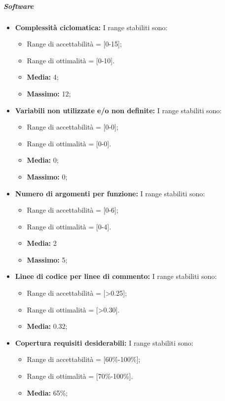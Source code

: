 \subparagraph{Software}
\begin{itemize}
\item \textbf{Complessità ciclomatica: }I range stabiliti sono:
      \begin{itemize}
        \item Range di accettabilità = [0-15];
        \item Range di ottimalità = [0-10].
        \item \textbf{Media: }4;
        \item \textbf{Massimo: }12;
      \end{itemize}

\item \textbf{Variabili non utilizzate e/o non definite: }I range stabiliti sono:
      \begin{itemize}
        \item Range di accettabilità = [0-0];
        \item Range di ottimalità = [0-0].
        \item \textbf{Media: }0;
        \item \textbf{Massimo: }0;
      \end{itemize}

\item \textbf{Numero di argomenti per funzione: }I range stabiliti sono:
      \begin{itemize}
        \item Range di accettabilità = [0-6];
        \item Range di ottimalità = [0-4].
        \item \textbf{Media: }2
        \item \textbf{Massimo: }5;
      \end{itemize}


\item \textbf{Linee di codice per linee di commento: } I range stabiliti sono:
      \begin{itemize}
        \item Range di accettabilità = [>0.25];
        \item Range di ottimalità = [>0.30].
        \item \textbf{Media: }0.32;
      \end{itemize}

\item \textbf{Copertura requisiti desiderabili: }I range stabiliti sono:
      \begin{itemize}
        \item Range di accettabilità = [60\%-100\%];
        \item Range di ottimalità = [70\%-100\%].
        \item \textbf{Media: }65\%;
      \end{itemize}
      

\end{itemize}
